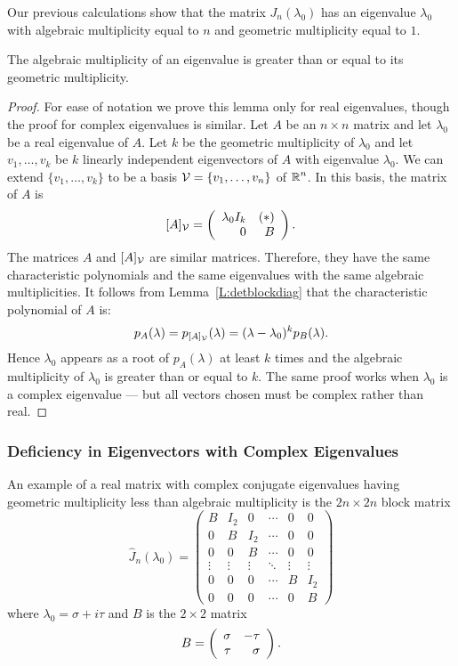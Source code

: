\documentclass{ximera}
\begin{document}
Our previous calculations show that the matrix $J_n(\lambda_0)$
has an eigenvalue $\lambda_0$ with algebraic multiplicity equal
to $n$ and geometric multiplicity equal to $1$.

\begin{lemma} 
The algebraic multiplicity of an eigenvalue is greater than 
or equal to its geometric multiplicity.
\end{lemma}

\begin{proof} For ease of notation we prove this lemma only for real 
eigenvalues, though the proof for complex eigenvalues is similar.  Let 
$A$ be an $n\times n$ matrix and let $\lambda_0$ be a real eigenvalue 
of $A$. Let $k$ be the geometric multiplicity of $\lambda_0$ and let 
$v_1,\ldots,v_k$ be $k$ linearly independent eigenvectors of $A$ with 
eigenvalue $\lambda_0$.   We can extend $\{v_1,\ldots,v_k\}$ to be a basis
${\cal V} = \{v_1,\ldots,v_n\}$ of $\mbox{$\Bbb{R}$}^n$.  In this basis, the matrix
of $A$ is 
\[
[A]_{\cal V} = \left(\begin{array}{rr} \lambda_0 I_k & (*)\\ 0 &B\end{array}\right).
\]
The matrices $A$ and $[A]_{\cal V}$ are similar matrices. Therefore,
they have the same 
characteristic polynomials
and the same eigenvalues 
with the same algebraic multiplicities.  It follows from 
Lemma~\ref{L:detblockdiag} that the characteristic polynomial of $A$ is:
\[
p_A(\lambda) = p_{[A]_{\cal V}}(\lambda) = (\lambda-\lambda_0)^kp_B(\lambda).
\]
Hence $\lambda_0$ appears as a root of $p_A(\lambda)$ at least 
$k$ times and the algebraic multiplicity of $\lambda_0$ 
is greater than or equal to $k$.   The same proof works when $\lambda_0$ 
is a complex eigenvalue --- but all vectors chosen must be complex rather
than real.   \end{proof}

\subsubsection*{Deficiency in Eigenvectors with Complex Eigenvalues}

An example of a real matrix with complex conjugate eigenvalues having 
geometric multiplicity less than algebraic multiplicity is the 
$2n \times 2n$ block matrix
\begin{equation} \label{E:JnC}
\widehat{J}_n(\lambda_0)=
\left(\begin{array}{cccccc} B & I_2 & 0 & \cdots & 0 & 0\\
	0 & B & I_2 & \cdots & 0 & 0 \\
	0 & 0 & B  & \cdots & 0 & 0\\
	\vdots & \vdots & \vdots & \ddots & \vdots & \vdots\\
	0 & 0 & 0 & \cdots & B & I_2 \\
	0 & 0 & 0 & \cdots & 0 & B \end{array}\right)
\end{equation}
where $\lambda_0=\sigma+i\tau$ and $B$ is the $2\times 2$ matrix
\[
B = \left(\begin{array}{rr} \sigma & -\tau\\ \tau &\sigma\end{array}\right).
\]
\end{document}
